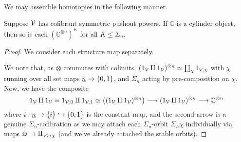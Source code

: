 \documentclass[a4paper,10pt
]{article}%
\renewcommand{\1}{\ensuremath{\mathbb{id}}}
\begin{document}
We may assemble homotopies in the following manner.

\begin{lemma}
      \label{ASSEM_HOM_LEM}
      Suppose $\mathcal V$ has cofibrant symmetric pushout powers.
      If $\mathbb C$ is a cylinder object, then so is each $\left(\mathbb C^{\otimes n}\right)^{K}$ for all $K \leq \Sigma_n$.
\end{lemma}
\begin{proof}
      We consider each structure map separately.
      
      We note that, as $\otimes$ commutes with colimits,
      $(1_{\mathcal V} \amalg 1_{\mathcal V})^{\otimes n} \simeq \coprod_{\chi} 1_{\mathcal V,\chi}$
      with $\chi$ running over all set maps $\underline{n} \to \left\{0,1\right\}$,
      and $\Sigma_n$ acting by pre-composition on $\chi$.
      Now, we have the composite
      \begin{equation}
            1_{\mathcal V} \amalg 1_{\mathcal V} = 1_{\mathcal V, 0} \amalg 1_{\mathcal V, 1}
            \simeq
            \left((1_{\mathcal V} \amalg 1_{\mathcal V})^{\otimes n}\right)
            \longrightarrow
            (1_{\mathcal V} \amalg 1_{\mathcal V})^{\otimes n}
            \longrightarrow
            \mathbb C^{\otimes n}
      \end{equation}
      where $i: \underline{n} \to \left\{i\right\} \hookrightarrow \left\{0,1\right\}$ is the constant map,
      and the second arrow is a genuine $\Sigma_n$-cofibration
      as we may attach each $\Sigma_n$-orbit $\Sigma_n \chi$ individually via maps $\varnothing \to \amalg_{\mathcal V,\sigma\chi}$
      (and we've already attached the stable orbits).


\end{proof}
\end{document}
